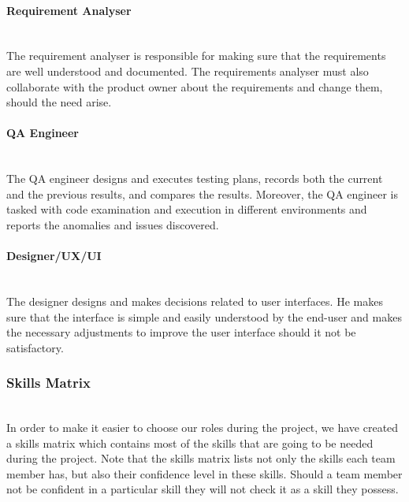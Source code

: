 \documentclass[../document.tex]{subfiles}
\begin{document}
\paragraph{Requirement Analyser} \ \\
The requirement analyser is responsible for making sure that the requirements are well understood and documented. The requirements analyser must also collaborate with the product owner about the requirements and change them, should the need arise.

\paragraph{QA Engineer} \ \\
The QA engineer designs and executes testing plans, records both the current and the previous results, and compares the results. Moreover, the QA engineer is tasked with code examination and execution in different environments and reports the anomalies and issues discovered. 

\paragraph{Designer/UX/UI} \ \\
The designer designs and makes decisions related to user interfaces. He makes sure that the interface is simple and easily understood by the end-user and makes the necessary adjustments to improve the user interface should it not be satisfactory.

\subsubsection{Skills Matrix} \ \\
In order to make it easier to choose our roles during the project, we have created a skills matrix which contains most of the skills that are going to be needed during the project. Note that the skills matrix lists not only the skills each team member has, but also their confidence level in these skills. Should a team member not be confident in a particular skill they will not check it as a skill they possess.
\end{document}
